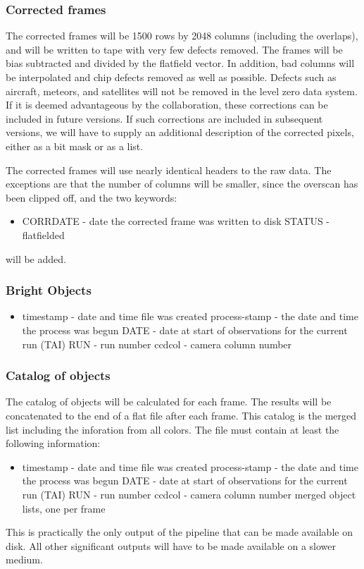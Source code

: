 \subsubsection{Corrected frames}

	The corrected frames will be 1500 rows by 2048 columns (including
the overlaps), and will be written to tape with very few
defects removed.  The frames will be bias subtracted and divided by
the flatfield vector.  In addition, bad columns will be interpolated and
chip defects removed as well as possible.  Defects such as aircraft,
meteors, and satellites will not be removed in the level zero data system.
If it is deemed advantageous by the collaboration, these corrections
can be included in future versions.  If such corrections are included in
subsequent versions, we will have to supply an additional description 
of the corrected pixels, either as a bit mask or as a list.

	The corrected frames will use nearly identical headers to the
raw data.  The exceptions are that the number of columns will be smaller,
since the overscan has been clipped off, and the two keywords:
\begin{itemize}
\item CORRDATE - date the corrected frame was written to disk
\sitem STATUS - flatfielded
\end{itemize}
will be added.

\subsubsection{Bright Objects}
\begin{itemize}
\item timestamp - date and time file was created
\sitem process-stamp - the date and time the process was begun
\sitem DATE - date at start of observations for the current run (TAI) 
\sitem RUN - run number
\sitem ccdcol - camera column number
\end{itemize}

\subsubsection{Catalog of objects}

The catalog of objects will be calculated for each frame.  The results
will be concatenated to the end of a flat file after each frame.  This
catalog is the merged list including the inforation from all colors.
The file must contain at least the following information:
\begin{itemize}
\item timestamp - date and time file was created
\sitem process-stamp - the date and time the process was begun
\sitem DATE - date at start of observations for the current run (TAI) 
\sitem RUN - run number
\sitem ccdcol - camera column number
\sitem merged object lists, one per frame
\end{itemize}
This is practically the only output of the pipeline that can be made
available on disk.  All other significant outputs will have to be made
available on a slower medium.

